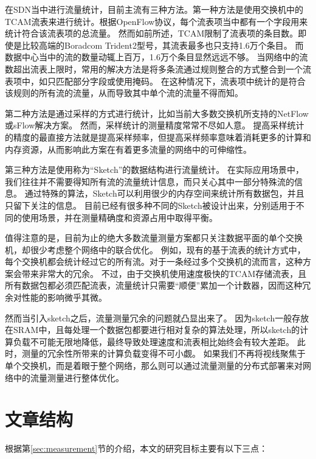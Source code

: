 在SDN当中进行流量统计，目前主流有三种方法。第一种方法是使用交换机中的TCAM流表来进行统计。根据OpenFlow协议\cite{pfaff2012openflow}，每个流表项当中都有一个字段用来统计符合该流表项的总流量。
然而如前所述，TCAM限制了流表项的条目数。即使是比较高端的Boradcom Trident2型号，其流表最多也只支持1.6万个条目\cite{cohen2014effect}。
而数据中心当中的流的数量动辄上百万\cite{kandula2009nature}，1.6万个条目显然远远不够。
当网络中的流数超出流表上限时，常用的解决方法是将多条流通过规则整合的方式整合到一个流表项中\cite{zhao2018joint}，如只匹配部分字段或使用掩码。
在这种情况下，流表项中统计的是符合该规则的所有流的流量，从而导致其中单个流的流量不得而知。

第二种方法是通过采样的方式进行统计，比如当前大多数交换机所支持的NetFlow\cite{estan2004building}或sFlow\cite{phaal2004sflow}解决方案。
然而，采样统计的测量精度常常不尽如人意\cite{yu2013software}\cite{li2016flowradar}。
提高采样统计的精度的最直接方法就是提高采样频率，但提高采样频率意味着消耗更多的计算和内存资源，从而影响此方案在有着更多流量的网络中的可伸缩性。

第三种方法是使用称为“Sketch”的数据结构进行流量统计。
在实际应用场景中，我们往往并不需要得知所有流的流量统计信息，而只关心其中一部分特殊流的信息。
通过特殊的算法，Sketch可以利用很少的内存空间来统计所有数据包，并且只留下关注的信息。
目前已经有很多种不同的Sketch被设计出来，分别适用于不同的使用场景，并在测量精确度和资源占用中取得平衡\cite{KXW06}\cite{li2012per}\cite{estan2002new}。

值得注意的是，目前为止的绝大多数流量测量方案都只关注数据平面的单个交换机，却很少考虑整个网络中的联合优化。
例如，现有的基于流表的统计方式中，每个交换机都会统计经过它的所有流。对于一条经过多个交换机的流而言，这种方案会带来非常大的冗余。
不过，由于交换机使用速度极快的TCAM存储流表，且所有数据包都必须匹配流表，流量统计只需要“顺便”累加一个计数器，因而这种冗余对性能的影响微乎其微。

然而当引入sketch之后，流量测量冗余的问题就凸显出来了。
因为sketch一般存放在SRAM中，且每处理一个数据包都要进行相对复杂的算法处理，所以sketch的计算负载不可能无限地降低，最终导致处理速度和流表相比始终会有较大差距。
此时，测量的冗余性所带来的计算负载变得不可小觑。
如果我们不再将视线聚焦于单个交换机，而是着眼于整个网络，那么则可以通过流量测量的分布式部署来对网络中的流量测量进行整体优化。

\section{文章结构}
根据第\ref{sec:measurement}节的介绍，本文的研究目标主要有以下三点：

